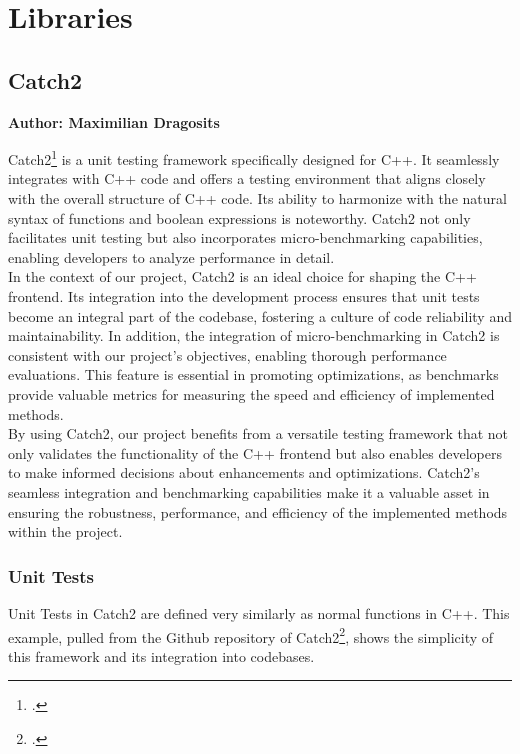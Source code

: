 \section{Libraries}

\subsection{Catch2}
\textbf{Author: Maximilian Dragosits}

Catch2\footcite{catch2_git} is a unit testing framework specifically designed for C++. It seamlessly integrates with C++ code and offers a testing environment 
that aligns closely with the overall structure of C++ code. Its ability to harmonize with the natural syntax of functions and boolean expressions is noteworthy. 
Catch2 not only facilitates unit testing but also incorporates micro-benchmarking capabilities, enabling developers to analyze performance in detail.\\

In the context of our project, Catch2 is an ideal choice for shaping the C++ frontend. Its integration into the development process ensures that unit tests 
become an integral part of the codebase, fostering a culture of code reliability and maintainability. In addition, the integration of micro-benchmarking in Catch2 
is consistent with our project's objectives, enabling thorough performance evaluations. This feature is essential in promoting optimizations, as benchmarks provide 
valuable metrics for measuring the speed and efficiency of implemented methods.\\

By using Catch2, our project benefits from a versatile testing framework that not only validates the functionality of the C++ frontend but also enables developers 
to make informed decisions about enhancements and optimizations. Catch2's seamless integration and benchmarking capabilities make it a valuable asset in ensuring 
the robustness, performance, and efficiency of the implemented methods within the project.

\subsubsection{Unit Tests}

Unit Tests in Catch2 are defined very similarly as normal functions in C++. This example, pulled from the Github repository of Catch2\footcite{catch2_git}, shows the simplicity of
this framework and its integration into codebases.

